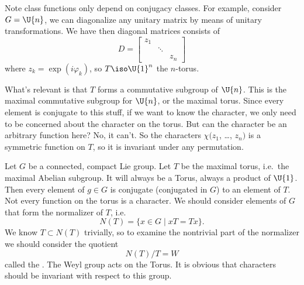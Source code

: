 Note class functions only depend on conjugacy classes. For
example, consider $G=\U{n}$, we can diagonalize any unitary
matrix by means of unitary transformations. We have then diagonal
matrices consists of
\begin{equation}
D = \begin{bmatrix}z_{1} & & \\
 & \ddots & \\
 &  & z_{n}
\end{bmatrix}
\end{equation}
where $z_{k}=\exp(i\varphi_{k})$, so $T\iso \U{1}^{n}$ the
$n$-torus.

What's relevant is that $T$ forms a commutative subgroup of
$\U{n}$. This is the maximal commutative subgroup for $\U{n}$, or
the maximal torus. Since every element is conjugate to this
stuff, if we want to know the character, we only need to be
concerned about the character on the torus. But can the character
be an arbitrary function here? No, it can't. So the characters
$\chi(z_{1}$, \dots, $z_{n})$ is a symmetric function on $T$, so it is
invariant under any permutation.

Let $G$ be a connected, compact Lie group. Let $T$ be the maximal
torus, i.e.\ the maximal Abelian subgroup. It will always be a
Torus, always a product of $\U{1}$. Then every element of $g\in
G$ is conjugate (conjugated in $G$) to an element of $T$. Not
every function on the torus is a character. We should consider
elements of $G$ that form the normalizer of $T$, i.e.
\begin{equation}
N(T) = \{x\in G\mid xT=Tx\}.
\end{equation}
We know $T\subset N(T)$ trivially, so to examine the nontrivial
part of the normalizer we should consider the quotient
\begin{equation}
N(T)/T = W
\end{equation}
called the . The Weyl group
acts on the Torus. It is obvious that characters should be
invariant with respect to this group.

